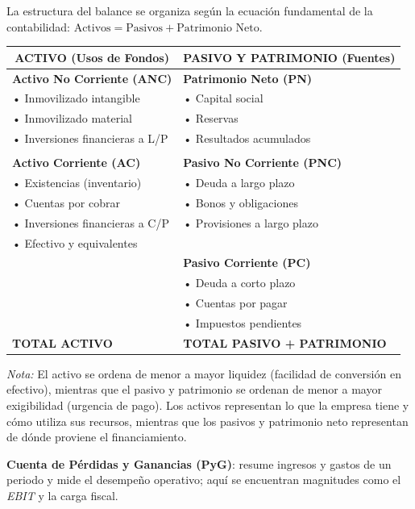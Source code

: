 La estructura del balance se organiza según la ecuación fundamental de la contabilidad: $\text{Activos} = \text{Pasivos} + \text{Patrimonio Neto}$.

\vspace{0.3cm}
\begin{center}
\begin{tabular}{p{7cm}|p{7cm}}
\toprule
\multicolumn{1}{c|}{\textbf{ACTIVO (Usos de Fondos)}} & \multicolumn{1}{c}{\textbf{PASIVO Y PATRIMONIO (Fuentes)}} \\
\midrule
\textbf{Activo No Corriente (ANC)} & \textbf{Patrimonio Neto (PN)} \\
\quad • Inmovilizado intangible & \quad • Capital social \\
\quad • Inmovilizado material & \quad • Reservas \\
\quad • Inversiones financieras a L/P & \quad • Resultados acumulados \\
& \\
\textbf{Activo Corriente (AC)} & \textbf{Pasivo No Corriente (PNC)} \\
\quad • Existencias (inventario) & \quad • Deuda a largo plazo \\
\quad • Cuentas por cobrar & \quad • Bonos y obligaciones \\
\quad • Inversiones financieras a C/P & \quad • Provisiones a largo plazo \\
\quad • Efectivo y equivalentes & \\
& \textbf{Pasivo Corriente (PC)} \\
& \quad • Deuda a corto plazo \\
& \quad • Cuentas por pagar \\
& \quad • Impuestos pendientes \\
\midrule
\textbf{TOTAL ACTIVO} & \textbf{TOTAL PASIVO + PATRIMONIO} \\
\bottomrule
\end{tabular}
\end{center}

\textit{Nota:} El activo se ordena de menor a mayor liquidez (facilidad de conversión en efectivo), mientras que el pasivo y patrimonio se ordenan de menor a mayor exigibilidad (urgencia de pago). Los activos representan lo que la empresa tiene y cómo utiliza sus recursos, mientras que los pasivos y patrimonio neto representan de dónde proviene el financiamiento.

\vspace{0.5cm}

\textbf{Cuenta de Pérdidas y Ganancias (PyG)}: resume ingresos y gastos de un periodo y mide el desempeño operativo; aquí se encuentran magnitudes como el \textit{EBIT} y la carga fiscal.

